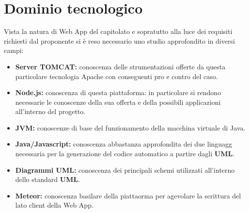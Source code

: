 \documentclass[a4paper]{report}
\begin{document}
      \section{Dominio tecnologico}
        Vista la natura di Web App del capitolato e sopratutto alla luce dei requisiti richiesti dal proponente si è reso necessario uno studio approfondito in diversi campi:
          \begin{itemize}
            \item \textbf{Server TOMCAT:} conoscenza delle strumentazioni offerte da questa particolare tecnologia Apache con conseguenti pro e contro del caso.
            \item \textbf{Node.js:} conoscenza di questa piattaforma: in particolare si rendono necessarie le conoscenze della sua offerta e della possibili applicazioni
            all'interno del progetto.
            \item \textbf{JVM:} conoscenze di base del funzionamento della macchina virtuale di Java.
            \item \textbf{Java/Javascript:} conoscenza abbastanza approfondita dei due linguagg necessaria per la generazione del codice automatico a partire dagli \textbf{UML}.
            \item \textbf{Diagrammi UML:} conoscenza dei principali schemi utilizzati all'interno dello standard \textbf{UML}.
            \item \textbf{Meteor:} conoscenza basilare della piattaorma per agevolare la scrittura del lato client della Web App.
          \end{itemize}
\end{document}
